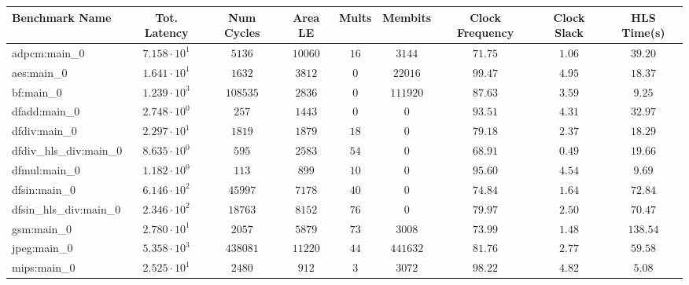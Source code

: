 \begin{tabular}{|l|c|c|c|c|c|c|c|c|}
\hline
Benchmark Name          & Tot. Latency           & Num Cycles & Area LE   & Mults   & Membits    & Clock Frequency & Clock Slack & HLS Time(s) \\
\hline
adpcm:main\_0           & $ 7.158 \cdot 10^{1} $ & $ 5136   $ & $ 10060 $ & $ 16  $ & $ 3144   $ & $ 71.75       $ & $ 1.06    $ & $ 39.20   $ \\
aes:main\_0             & $ 1.641 \cdot 10^{1} $ & $ 1632   $ & $ 3812  $ & $ 0   $ & $ 22016  $ & $ 99.47       $ & $ 4.95    $ & $ 18.37   $ \\
bf:main\_0              & $ 1.239 \cdot 10^{3} $ & $ 108535 $ & $ 2836  $ & $ 0   $ & $ 111920 $ & $ 87.63       $ & $ 3.59    $ & $ 9.25    $ \\
dfadd:main\_0           & $ 2.748 \cdot 10^{0} $ & $ 257    $ & $ 1443  $ & $ 0   $ & $ 0      $ & $ 93.51       $ & $ 4.31    $ & $ 32.97   $ \\
dfdiv:main\_0           & $ 2.297 \cdot 10^{1} $ & $ 1819   $ & $ 1879  $ & $ 18  $ & $ 0      $ & $ 79.18       $ & $ 2.37    $ & $ 18.29   $ \\
dfdiv\_hls\_div:main\_0 & $ 8.635 \cdot 10^{0} $ & $ 595    $ & $ 2583  $ & $ 54  $ & $ 0      $ & $ 68.91       $ & $ 0.49    $ & $ 19.66   $ \\
dfmul:main\_0           & $ 1.182 \cdot 10^{0} $ & $ 113    $ & $ 899   $ & $ 10  $ & $ 0      $ & $ 95.60       $ & $ 4.54    $ & $ 9.69    $ \\
dfsin:main\_0           & $ 6.146 \cdot 10^{2} $ & $ 45997  $ & $ 7178  $ & $ 40  $ & $ 0      $ & $ 74.84       $ & $ 1.64    $ & $ 72.84   $ \\
dfsin\_hls\_div:main\_0 & $ 2.346 \cdot 10^{2} $ & $ 18763  $ & $ 8152  $ & $ 76  $ & $ 0      $ & $ 79.97       $ & $ 2.50    $ & $ 70.47   $ \\
gsm:main\_0             & $ 2.780 \cdot 10^{1} $ & $ 2057   $ & $ 5879  $ & $ 73  $ & $ 3008   $ & $ 73.99       $ & $ 1.48    $ & $ 138.54  $ \\
jpeg:main\_0            & $ 5.358 \cdot 10^{3} $ & $ 438081 $ & $ 11220 $ & $ 44  $ & $ 441632 $ & $ 81.76       $ & $ 2.77    $ & $ 59.58   $ \\
mips:main\_0            & $ 2.525 \cdot 10^{1} $ & $ 2480   $ & $ 912   $ & $ 3   $ & $ 3072   $ & $ 98.22       $ & $ 4.82    $ & $ 5.08    $ \\

\end{tabular}
